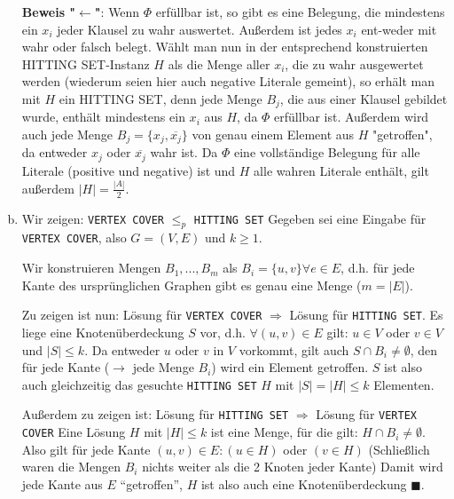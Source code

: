 \documentclass[12pt,a4paper]{article}
\begin{document}
\begin{enumerate}[a)]
	\textbf{Beweis "\(\leftarrow\)"}: Wenn \(\Phi\) erfüllbar ist, so gibt es eine Belegung, die mindestens ein \(x_i\) jeder Klausel zu wahr auswertet. Außerdem ist jedes \(x_i\) ent-weder mit wahr oder falsch belegt. Wählt man nun in der entsprechend konstruierten HITTING SET-Instanz \(H\) als die Menge aller \(x_i\), die zu wahr ausgewertet werden (wiederum seien hier auch negative Literale gemeint), so erhält man mit \(H\) ein HITTING SET, denn jede Menge \(B_j\), die aus einer Klausel gebildet wurde, enthält mindestens ein \(x_i\) aus \(H\), da \(\Phi\) erfüllbar ist. Außerdem wird auch jede Menge \(B_j = \{x_j, \overline{x_j}\}\) von genau einem Element aus \(H\) "getroffen", da entweder \(x_j\) oder \(\overline{x_j}\) wahr ist. Da \(\Phi\) eine vollständige Belegung für alle Literale (positive und negative) ist und \(H\) alle wahren Literale enthält, gilt außerdem \(|H| = \frac{|A|}{2}\).

	\item Wir zeigen: \texttt{VERTEX COVER} $\leq_p$ \texttt{HITTING SET}
	Gegeben sei eine Eingabe für \texttt{VERTEX COVER}, also $G = (V, E)$ und $k \geq 1$.
	
	Wir konstruieren Mengen $B_1, ..., B_m$ als $B_i = \{u, v\} \forall e \in E$, d.h. für jede Kante des ursprünglichen Graphen gibt es genau eine Menge ($m = |E|$).
	
	Zu zeigen ist nun: Lösung für \texttt{VERTEX COVER} $\Rightarrow$ Lösung für \texttt{HITTING SET}.
	Es liege eine Knotenüberdeckung $S$ vor, d.h. $\forall (u, v) \in E$ gilt: $u \in V$ oder $v \in V$ und $|S| \leq k$. Da entweder $u$ oder $v$ in $V$ vorkommt, gilt auch $S \cap B_i \neq \emptyset$, den für jede Kante ($\rightarrow$ jede Menge $B_i$) wird ein Element getroffen. $S$ ist also auch gleichzeitig das gesuchte \texttt{HITTING SET} $H$ mit $|S| = |H| \leq k$ Elementen.
	
	Außerdem zu zeigen ist: Lösung für \texttt{HITTING SET} $\Rightarrow$ Lösung für \texttt{VERTEX COVER}
	Eine Lösung $H$ mit $|H| \leq k$ ist eine Menge, für die gilt: $H \cap B_i \neq \emptyset$. Also gilt für jede Kante $(u, v) \in E : (u \in H)$ oder $(v \in H)$ (Schließlich waren die Mengen $B_i$ nichts weiter als die 2 Knoten jeder Kante) Damit wird jede Kante aus $E$ ``getroffen'', $H$ ist also auch eine Knotenüberdeckung $\blacksquare$.

\end{enumerate}
\end{document}

